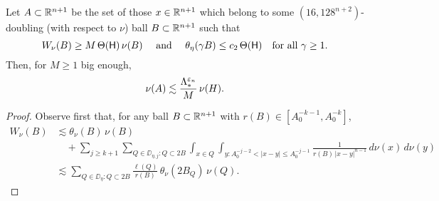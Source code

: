 \vv
\begin{lemma}\label{lem*921}
Let $A\subset {\mathbb R}^{n+1}$ be the set of those $x\in{\mathbb R}^{n+1}$ which belong to some 
$(16,128^{n+2})$-doubling (with respect to $\nu$) ball $B\subset{\mathbb R}^{n+1}$ such that
$$W_\nu(B)\geq M\,\Theta({\mathsf{H}})\,\nu(B)\quad \mbox{ and } \quad
\theta_\eta( \gamma B)\leq c_2\,\Theta({\mathsf{H}}) \quad\mbox{for all $\gamma\geq1$.}$$
Then, for $M\geq1$ big enough, 
$$\nu(A) \lesssim \frac{\Lambda_*^{{\varepsilon}_n}}{M} \,\nu(H).$$
\end{lemma}

\begin{proof}
Observe first that, for any ball $B\subset{\mathbb R}^{n+1}$ with $r(B)\in[A_0^{-k-1},A_0^{-k}]$,
\begin{align*}
W_\nu(B) &\lesssim
\theta_\nu(B)\,\nu(B) \\
&\quad+ \sum_{j\geq k+1} \sum_{Q\in\DD_{\eta,j}:Q\subset 2B}\int_{x\in Q}\int_{y:
A_0^{-j-2}<|x-y|\leq A_0^{-j-1}}
\frac1{r(B)\,|x-y|^{n-1}}\, d\nu(x)\,d\nu(y)\\
& \lesssim \sum_{Q\in\DD_{\eta}:Q\subset 2B} \frac{\ell(Q)}{r(B)}\,\theta_\nu(2B_Q)\,\nu(Q).
\end{align*}


\end{proof}
